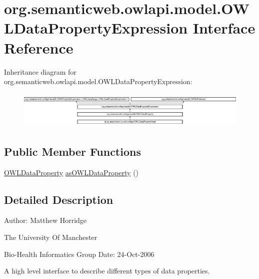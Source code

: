 \hypertarget{interfaceorg_1_1semanticweb_1_1owlapi_1_1model_1_1_o_w_l_data_property_expression}{\section{org.\-semanticweb.\-owlapi.\-model.\-O\-W\-L\-Data\-Property\-Expression Interface Reference}
\label{interfaceorg_1_1semanticweb_1_1owlapi_1_1model_1_1_o_w_l_data_property_expression}
}
Inheritance diagram for org.\-semanticweb.\-owlapi.\-model.\-O\-W\-L\-Data\-Property\-Expression\-:\begin{figure}[H]
\begin{center}
\leavevmode
\includegraphics[height=1.774960cm]{interfaceorg_1_1semanticweb_1_1owlapi_1_1model_1_1_o_w_l_data_property_expression}
\end{center}
\end{figure}
\subsection*{Public Member Functions}
\begin{DoxyCompactItemize}
\item 
\hyperlink{interfaceorg_1_1semanticweb_1_1owlapi_1_1model_1_1_o_w_l_data_property}{O\-W\-L\-Data\-Property} \hyperlink{interfaceorg_1_1semanticweb_1_1owlapi_1_1model_1_1_o_w_l_data_property_expression_a2c059e12e537529f1a4dd8d714db3ff6}{as\-O\-W\-L\-Data\-Property} ()
\end{DoxyCompactItemize}


\subsection{Detailed Description}
Author\-: Matthew Horridge\par
 The University Of Manchester\par
 Bio-\/\-Health Informatics Group Date\-: 24-\/\-Oct-\/2006

A high level interface to describe different types of data properties. 

